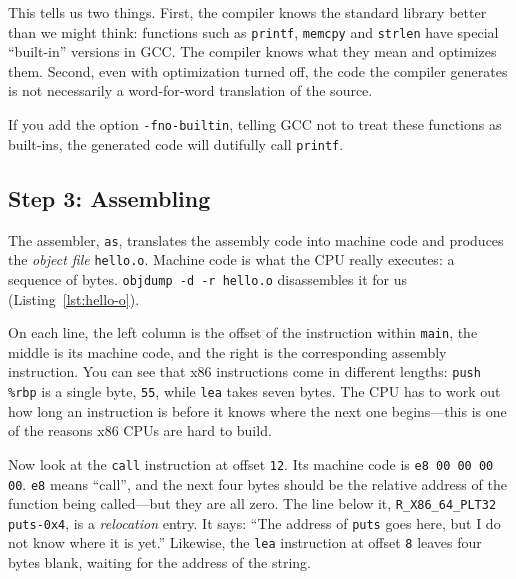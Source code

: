 This tells us two things. First, the compiler knows the standard library better than we might think: functions such as \texttt{printf}, \texttt{memcpy} and \texttt{strlen} have special ``built-in'' versions in GCC. The compiler knows what they mean and optimizes them. Second, even with optimization turned off, the code the compiler generates is not necessarily a word-for-word translation of the source.

If you add the option \texttt{-fno-builtin}, telling GCC not to treat these functions as built-ins, the generated code will dutifully call \texttt{printf}.

\subsection{Step 3: Assembling}

The assembler, \texttt{as}, translates the assembly code into machine code and produces the \emph{object file} \texttt{hello.o}. Machine code is what the CPU really executes: a sequence of bytes. \texttt{objdump -d -r hello.o} disassembles it for us (Listing~\ref{lst:hello-o}).


On each line, the left column is the offset of the instruction within \texttt{main}, the middle is its machine code, and the right is the corresponding assembly instruction. You can see that x86 instructions come in different lengths: \texttt{push \%rbp} is a single byte, \texttt{55}, while \texttt{lea} takes seven bytes. The CPU has to work out how long an instruction is before it knows where the next one begins---this is one of the reasons x86 CPUs are hard to build.

Now look at the \texttt{call} instruction at offset \texttt{12}. Its machine code is \texttt{e8 00 00 00 00}. \texttt{e8} means ``call'', and the next four bytes should be the relative address of the function being called---but they are all zero. The line below it, \texttt{R\_X86\_64\_PLT32 puts-0x4}, is a \emph{relocation} entry. It says: ``The address of \texttt{puts} goes here, but I do not know where it is yet.'' Likewise, the \texttt{lea} instruction at offset \texttt{8} leaves four bytes blank, waiting for the address of the string.

